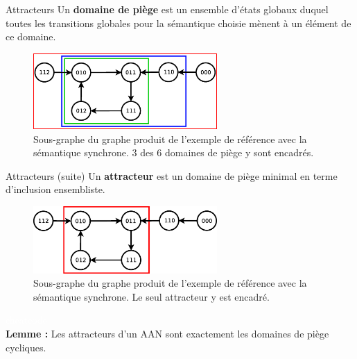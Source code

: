 \documentclass{beamer}
\begin{document}
\begin{frame}{Attracteurs}
	\pause
	Un \textbf{domaine de piège} est un ensemble d'états globaux duquel toutes les transitions globales pour la sémantique choisie mènent à un élément de ce domaine.\\
	\begin{figure}[!h]
		\pause
		\includegraphics[width=7cm]{presonal_example_synch.eps}
		\caption{Sous-graphe du graphe produit de l'exemple de référence avec la sémantique synchrone. 3 des 6 domaines de piège y sont encadrés.}
	\end{figure}
\end{frame}

\begin{frame}{Attracteurs (suite)}
	\pause
	Un \textbf{attracteur} est un domaine de piège minimal en terme d'inclusion ensembliste.\\
	\begin{figure}[!h]
		\pause
		\includegraphics[width=7cm]{presonal_example_synch2.eps}
		\caption{Sous-graphe du graphe produit de l'exemple de référence avec la sémantique synchrone. Le seul attracteur y est encadré.}
	\end{figure}
	\pause
	\textcolor{white}{cheatcode}\\
	\textbf{Lemme :} Les attracteurs d'un AAN sont exactement les domaines de piège cycliques.
\end{frame}
\end{document}
